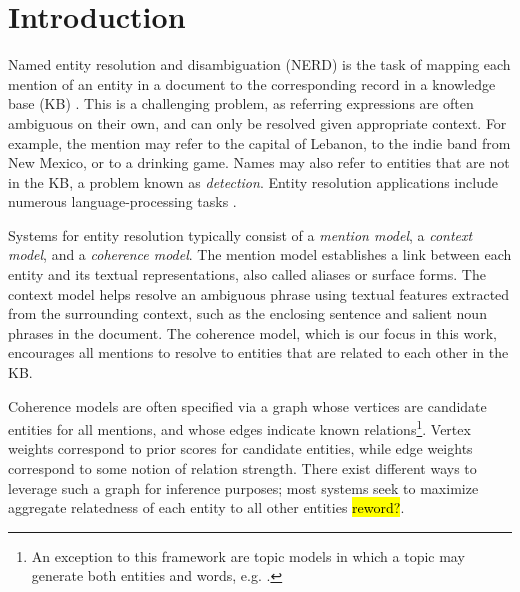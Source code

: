 \section{Introduction}
\label{sec:intro}

Named entity resolution and disambiguation (NERD) is the task of mapping each mention of an entity in a document to the corresponding record in a knowledge base (KB) \cite{BunescuP06,Cucerzan07,KulkarniSRC09,Dredze2010,Hoffart2011,Hachey2013130}.  
This is a challenging problem, as referring expressions are often ambiguous on their own, and can only be resolved given appropriate context. For example, the mention  may refer to the capital of Lebanon, to the indie band from New Mexico, or to a drinking game. Names may also refer to entities that are not in the KB, a problem known as \emph{{\NIL} detection}. 
Entity resolution applications include numerous language-processing tasks  \cite{Gabrilovich2007,Lin2012,finin2009Coreference,mayfield2009cross}. %

Systems for entity resolution typically consist of a \emph{mention model}, a \emph{context model}, and a \emph{coherence model}. The mention model establishes a link between each entity and its textual representations, also called aliases or surface forms. The context model helps resolve an ambiguous phrase using textual features extracted from the surrounding context, such as the enclosing sentence and salient noun phrases in the document. The coherence model, which is our focus in this work, encourages all mentions to resolve to entities that are related to each other in the KB. 

Coherence models are often specified via a graph whose vertices are candidate entities for all mentions, and whose edges indicate known relations\footnote{An exception to this framework are topic models in which a topic may generate both entities and words, e.g. \cite{kataria2011,HanS12,houlsby2014scalable}.}.  Vertex weights correspond to prior scores for candidate entities, while edge weights correspond to some notion of relation strength. There exist different ways to leverage such a graph for inference purposes; most systems seek to maximize aggregate relatedness of each entity to all other entities \hl{reword?}. 


